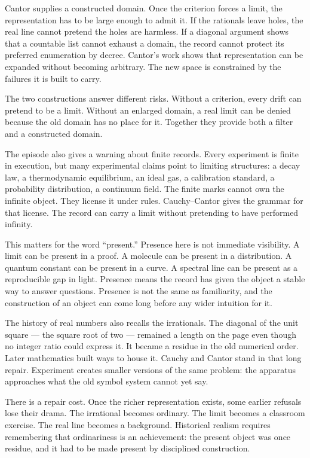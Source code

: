 Cantor supplies a constructed domain. Once the criterion forces a limit,
the representation has to be large enough to admit it.
If the rationals leave holes, the real line cannot pretend the holes
are harmless. If a diagonal argument shows that a countable list cannot
exhaust a domain, the record cannot protect its preferred enumeration by
decree. Cantor's work shows that representation can be expanded without
becoming arbitrary. The new space is constrained by the failures it is
built to carry.

The two constructions answer different risks. Without a criterion, every
drift can pretend to be a limit. Without an enlarged domain, a real limit
can be denied because the old domain has no place for it. Together they
provide both a filter and a constructed domain.

The episode also gives a warning about finite records. Every experiment
is finite in execution, but many experimental claims point to limiting
structures: a decay law, a thermodynamic equilibrium, an ideal gas, a
calibration standard, a probability distribution, a continuum field.
The finite marks cannot own the infinite object. They license it under
rules. Cauchy--Cantor gives the grammar for that license. The record
can carry a limit without pretending to have performed infinity.

This matters for the word ``present.'' Presence here is not immediate
visibility. A limit can be present in a proof. A molecule can be present
in a distribution. A quantum constant can be present in a curve. A
spectral line can be present as a reproducible gap in light. Presence
means the record has given the object a stable way to answer questions.
Presence is not the same as familiarity, and the construction of an
object can come long before any wider intuition for it.

The history of real numbers also recalls the irrationals. The diagonal
of the unit square --- the square root of two --- remained a length on
the page even though no integer ratio could express it. It became a
residue in the old numerical order. Later mathematics built ways to
house it. Cauchy and Cantor stand in that long repair. Experiment creates smaller
versions of the same problem: the apparatus approaches what the old
symbol system cannot yet say.

There is a repair cost. Once the richer representation exists, some
earlier refusals lose their drama. The irrational becomes ordinary. The
limit becomes a classroom exercise. The real line becomes a background.
Historical realism requires remembering that ordinariness is an
achievement: the present object was once residue, and it had to be made
present by disciplined construction.

